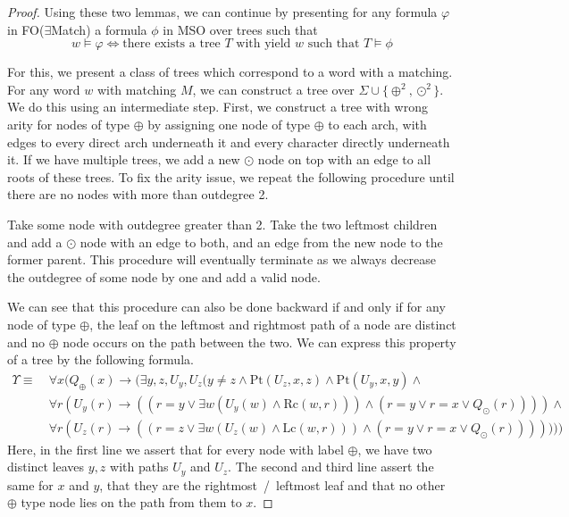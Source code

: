 \begin{proof}
    Using these two lemmas, we can continue by presenting for any formula $\varphi$ in FO($\exists$Match) a formula $\phi$ in MSO over trees such that
    \[w \models \varphi \Leftrightarrow \text{there exists a tree $T$ with yield $w$ such that } T \models \phi\]

    For this, we present a class of trees which correspond to a word with a matching.
    For any word $w$ with matching $M$, we can construct a tree over $\Sigma \cup \{\oplus^2, \odot^2\}$.
    We do this using an intermediate step.
    First, we construct a tree with wrong arity for nodes of type $\oplus$ by assigning one node of type $\oplus$ to each arch, with edges to every direct arch underneath it and every character directly underneath it.
    If we have multiple trees, we add a new $\odot$ node on top with an edge to all roots of these trees.
    To fix the arity issue, we repeat the following procedure until there are no nodes with more than outdegree 2.

    Take some node with outdegree greater than 2.
    Take the two leftmost children and add a $\odot$ node with an edge to both, and an edge from the new node to the former parent.
    This procedure will eventually terminate as we always decrease the outdegree of some node by one and add a valid node.

    We can see that this procedure can also be done backward if and only if for any node of type $\oplus$, the leaf on the leftmost and rightmost path of a node are distinct and no $\oplus$ node occurs on the path between the two.
    We can express this property of a tree by the following formula.
    \begin{align*}
        \Upsilon \equiv~& \forall x ( Q_{\oplus}(x) \to ( \exists y, z, U_y, U_z (y \neq z \land \text{Pt}(U_z, x, z) \land \text{Pt}(U_y, x, y) \land \\
        &\forall r (U_y(r) \to ((r = y \lor \exists w (U_y(w) \land \text{Rc}(w, r)))\land (r = y \lor r = x \lor Q_{\odot}(r)))) \land \\
        &\forall r (U_z(r) \to ((r = z \lor \exists w (U_z(w) \land \text{Lc}(w, r)))\land (r = y \lor r = x \lor Q_{\odot}(r)))))))
    \end{align*}
    Here, in the first line we assert that for every node with label $\oplus$, we have two distinct leaves $y, z$ with paths $U_y$ and $U_z$.
    The second and third line assert the same for $x$ and $y$, that they are the rightmost~/~leftmost leaf and that no other $\oplus$ type node lies on the path from them to $x$.


\end{proof}
